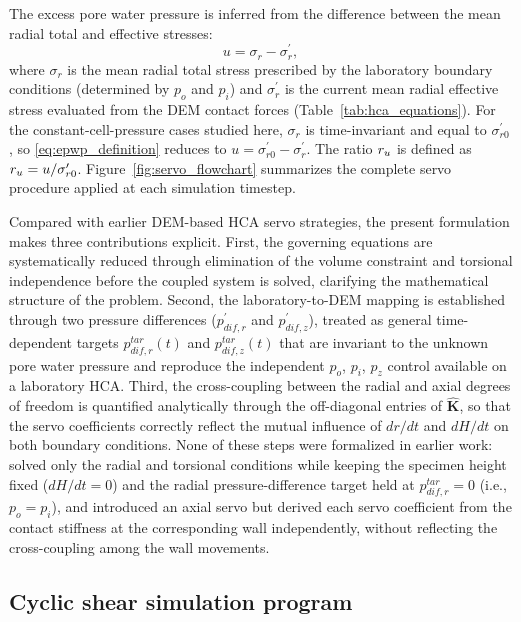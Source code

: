 The excess pore water pressure is inferred from the difference between the mean radial total and effective stresses:
\begin{equation}
u = \sigma_r - \sigma_r^{\prime},
\label{eq:epwp_definition}
\end{equation}
where $\sigma_r$ is the mean radial total stress prescribed by the laboratory boundary conditions (determined by $p_o$ and $p_i$) and $\sigma_r^{\prime}$ is the current mean radial effective stress evaluated from the DEM contact forces (Table~\ref{tab:hca_equations}). For the constant-cell-pressure cases studied here, $\sigma_r$ is time-invariant and equal to $\sigma_{r0}^{\prime}$, so \cref{eq:epwp_definition} reduces to $u = \sigma_{r0}^{\prime} - \sigma_r^{\prime}$. The ratio $r_u$ is defined as $r_u = u/\sigma_{r0}^{\prime}$. Figure~\ref{fig:servo_flowchart} summarizes the complete servo procedure applied at each simulation timestep.

Compared with earlier DEM-based HCA servo strategies, the present formulation makes three contributions explicit. First, the governing equations are systematically reduced through elimination of the volume constraint and torsional independence before the coupled system is solved, clarifying the mathematical structure of the problem. Second, the laboratory-to-DEM mapping is established through two pressure differences ($p_{dif,r}^{\prime}$ and $p_{dif,z}^{\prime}$), treated as general time-dependent targets $p_{dif,r}^{tar}(t)$ and $p_{dif,z}^{tar}(t)$ that are invariant to the unknown pore water pressure and reproduce the independent $p_o$, $p_i$, $p_z$ control available on a laboratory HCA. Third, the cross-coupling between the radial and axial degrees of freedom is quantified analytically through the off-diagonal entries of $\hat{\mathbf{K}}$, so that the servo coefficients correctly reflect the mutual influence of $dr/dt$ and $dH/dt$ on both boundary conditions. None of these steps were formalized in earlier work: \citet{Han2024jgs} solved only the radial and torsional conditions while keeping the specimen height fixed ($dH/dt=0$) and the radial pressure-difference target held at $p_{dif,r}^{tar}=0$ (i.e., $p_o=p_i$), and \citet{Ma2024} introduced an axial servo but derived each servo coefficient from the contact stiffness at the corresponding wall independently, without reflecting the cross-coupling among the wall movements.

\FloatBarrier

\subsection{Cyclic shear simulation program}
\label{subsec:cyclic_program}

